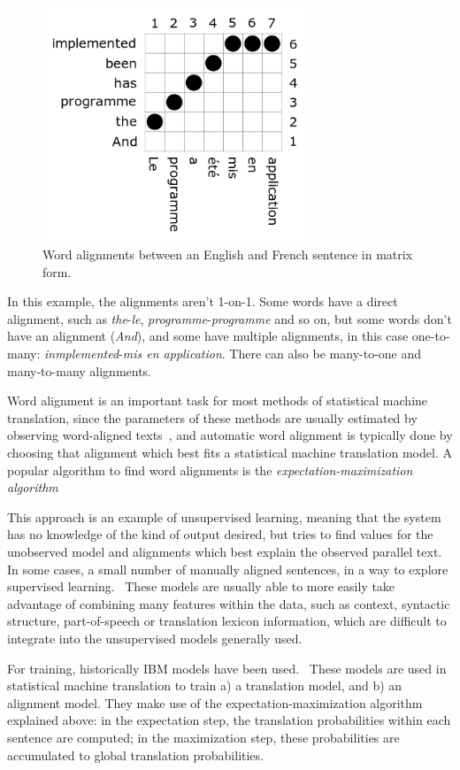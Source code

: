 \begin{figure}[!ht]
    \centering
    \includegraphics[width=8cm]{figures/word_align_matrix.png}
    \caption{Word alignments between an English and French sentence in matrix form.}
\end{figure}

In this example, the alignments aren't 1-on-1. Some words have a direct alignment, such as \emph{the}-\emph{le}, \emph{programme}-\emph{programme} and so on, but some words don't have an alignment (\emph{And}), and some have multiple alignments, in this case one-to-many: \emph{inmplemented}-\emph{mis en application}. There can also be many-to-one and many-to-many alignments.

Word alignment is an important task for most methods of statistical machine translation, since the parameters of these methods are usually estimated by observing word-aligned texts~\cite{brown1993mathematics}, and automatic word alignment is typically done by choosing that alignment which best fits a statistical machine translation model. A popular algorithm to find word alignments is the \emph{expectation-maximization algorithm}~\cite{och1999improved}

This approach is an example of unsupervised learning, meaning that the system has no knowledge of the kind of output desired, but tries to find values for the unobserved model and alignments which best explain the observed parallel text. In some cases, a small number of manually aligned sentences, in a way to explore supervised learning.~\cite{varga2007parallel} These models are usually able to more easily take advantage of combining many features within the data, such as context, syntactic structure, part-of-speech or translation lexicon information, which are difficult to integrate into the unsupervised models generally used.

For training, historically IBM models have been used.~\cite{koehn2009statistical} These models are used in statistical machine translation to train a) a translation model, and b) an alignment model. They make use of the expectation-maximization algorithm explained above: in the expectation step, the translation probabilities within each sentence are computed; in the maximization step, these probabilities are accumulated to global translation probabilities.

